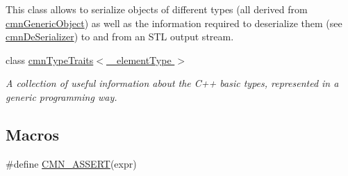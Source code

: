 \begin{DoxyCompactItemize}
\begin{DoxyCompactList}
This class allows to serialize objects of different types (all derived from \hyperlink{classcmn_generic_object}{cmn\+Generic\+Object}) as well as the information required to deserialize them (see \hyperlink{classcmn_de_serializer}{cmn\+De\+Serializer}) to and from an S\+T\+L output stream. \end{DoxyCompactList}\item 
class \hyperlink{classcmn_type_traits}{cmn\+Type\+Traits$<$ \+\_\+element\+Type $>$}
\begin{DoxyCompactList}\small\item\em A collection of useful information about the C++ basic types, represented in a generic programming way. \end{DoxyCompactList}\end{DoxyCompactItemize}
\subsection*{Macros}
\begin{DoxyCompactItemize}
\item 
\#define \hyperlink{group__cisst_common_ga6a12b7031ea38ac5bf5937b8633c97ff}{C\+M\+N\+\_\+\+A\+S\+S\+E\+R\+T}(expr)
\end{DoxyCompactItemize}
